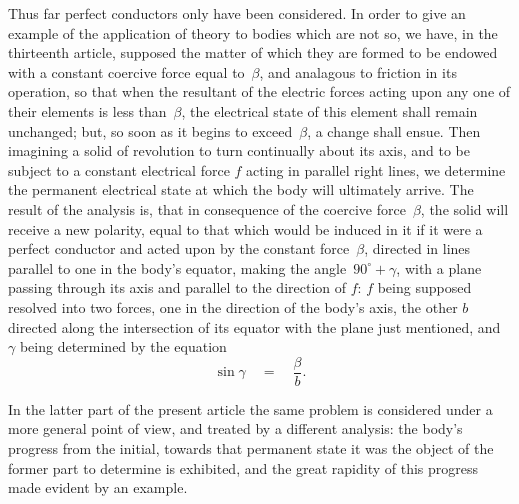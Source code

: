 \documentclass[12pt,notitlepage]{amsart}
\begin{document}
Thus far perfect conductors only have been considered. In order to
give an example of the application of theory to bodies which are not so, we
have, in the thirteenth article, supposed the matter of which they are formed
to be endowed with a constant coercive force equal to~$\beta$, and analagous to
friction in its operation,
so that when the resultant of the electric forces acting
upon any one of their elements is less than~$\beta$,
the electrical state of this
element shall remain unchanged;
but, so soon as it begins to exceed~$\beta$, a
change shall ensue. Then imagining a solid of revolution to turn continually
about its axis, and to be subject to a constant electrical force $f$ acting in
parallel right lines, we determine the permanent electrical state at which the
body will ultimately arrive. The result of the analysis is, that in consequence
of the coercive force~$\beta$,
the solid will receive a new polarity, equal to that
which would be induced in it if it were a perfect conductor and acted upon
by the constant force~$\beta$,
directed in lines parallel to one in the body's equator,
making the angle~$90^\circ+\gamma$,
with a plane passing through its axis and parallel
to the direction of $f$: $f$ being supposed resolved into two forces, one in the
direction of the body's axis, the other $b$
directed along the intersection of its
equator with the plane just mentioned,
and $\gamma$ being determined by the equation
\[
\sin\gamma\quad=\quad\frac{\beta}{b}.
\]

In the latter part of the present article the same problem is considered
under a more general point of view, and treated by a different analysis: the
body's progress from the initial, towards that permanent state it was the object
of the former part to determine is exhibited, and the great rapidity of this
progress made evident by an example.
\end{document}
